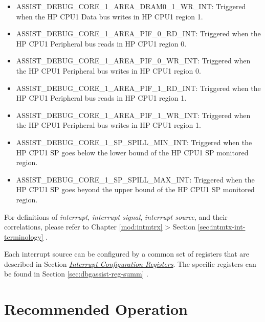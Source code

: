 \documentclass[main\_\_EN.tex]{subfiles}
\begin{document}
\begin{itemize}
\item \label{int:ASSISTDEBUGCORE1AREADRAM01WRINT}ASSIST\_DEBUG\_CORE\_1\_AREA\_DRAM0\_1\_WR\_INT: Triggered when the HP CPU1 Data bus writes in HP CPU1 region 1.
\item \label{int:ASSISTDEBUGCORE1AREAPIF0RDINT}ASSIST\_DEBUG\_CORE\_1\_AREA\_PIF\_0\_RD\_INT: Triggered when the HP CPU1 Peripheral bus reads in HP CPU1 region 0.
\item \label{int:ASSISTDEBUGCORE1AREAPIF0WRINT}ASSIST\_DEBUG\_CORE\_1\_AREA\_PIF\_0\_WR\_INT: Triggered when the HP CPU1 Peripheral bus writes in HP CPU1 region 0.
\item \label{int:ASSISTDEBUGCORE1AREAPIF1RDINT}ASSIST\_DEBUG\_CORE\_1\_AREA\_PIF\_1\_RD\_INT: Triggered when the HP CPU1 Peripheral bus reads in HP CPU1 region 1.
\item \label{int:ASSISTDEBUGCORE1AREAPIF1WRINT}ASSIST\_DEBUG\_CORE\_1\_AREA\_PIF\_1\_WR\_INT: Triggered when the HP CPU1 Peripheral bus writes in HP CPU1 region 1.
\item
\label{int:ASSISTDEBUGCORE1SPSPILLMININT}ASSIST\_DEBUG\_CORE\_1\_SP\_SPILL\_MIN\_INT: Triggered when the HP CPU1 SP goes below the lower bound of the HP CPU1 SP monitored region.
\item
\label{int:ASSISTDEBUGCORE1SPSPILLMAXINT}ASSIST\_DEBUG\_CORE\_1\_SP\_SPILL\_MAX\_INT: Triggered when the HP CPU1 SP goes beyond the upper bound of the HP CPU1 SP monitored region.
\end{itemize}

\begin{tiplisting}
For definitions of \textit{interrupt}, \textit{interrupt signal}, \textit{interrupt source}, and their correlations, please refer to Chapter \ref{mod:intmtrx} \textit{} > Section \ref{sec:intmtx-int-terminology} \textit{}.
\end{tiplisting}

Each interrupt source can be configured by a common set of registers that are described in Section \hyperref[interrupt-config-registers]{\textit{Interrupt Configuration Registers}}. The specific registers can be found in Section \ref{sec:dbgassist-reg-summ} \textit{}.

\section{Recommended Operation}
\label{sec:dbgassist-recommended-operation}
\end{document}

